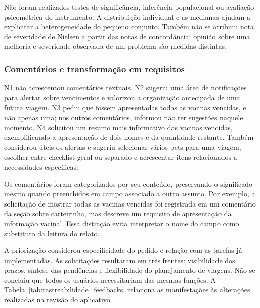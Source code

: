 \documentclass{UNESC}
\begin{document}
Não foram realizados testes de significância, inferência populacional ou avaliação psicométrica do instrumento. A distribuição individual e as medianas ajudam a explicitar a heterogeneidade do pequeno conjunto. Também não se atribuiu nota de severidade de Nielsen a partir das notas de concordância: opinião sobre uma melhoria e severidade observada de um problema são medidas distintas.

\subsubsection{Comentários e transformação em requisitos}

N1 não acrescentou comentários textuais. N2 sugeriu uma área de notificações para alertar sobre vencimentos e valorizou a organização antecipada de uma futura viagem. N3 pediu que fossem apresentadas todas as vacinas vencidas, e não apenas uma; nos outros comentários, informou não ter sugestões naquele momento. N4 solicitou um resumo mais informativo das vacinas vencidas, exemplificando a apresentação de dois nomes e da quantidade restante. Também considerou úteis os alertas e sugeriu selecionar vários pets para uma viagem, escolher entre checklist geral ou separado e acrescentar itens relacionados a necessidades específicas.

Os comentários foram categorizados por seu conteúdo, preservando o significado mesmo quando preenchidos em campo associado a outro assunto. Por exemplo, a solicitação de mostrar todas as vacinas vencidas foi registrada em um comentário da seção sobre carteirinha, mas descreve um requisito de apresentação da informação vacinal. Essa distinção evita interpretar o nome do campo como substituto da leitura do relato.

A priorização considerou especificidade do pedido e relação com as tarefas já implementadas. As solicitações resultaram em três frentes: visibilidade dos prazos, síntese das pendências e flexibilidade do planejamento de viagens. Não se concluiu que todos os usuários necessitariam das mesmas funções. A Tabela~\ref{tab:rastreabilidade_feedbacks} relaciona as manifestações às alterações realizadas na revisão do aplicativo.
\end{document}
